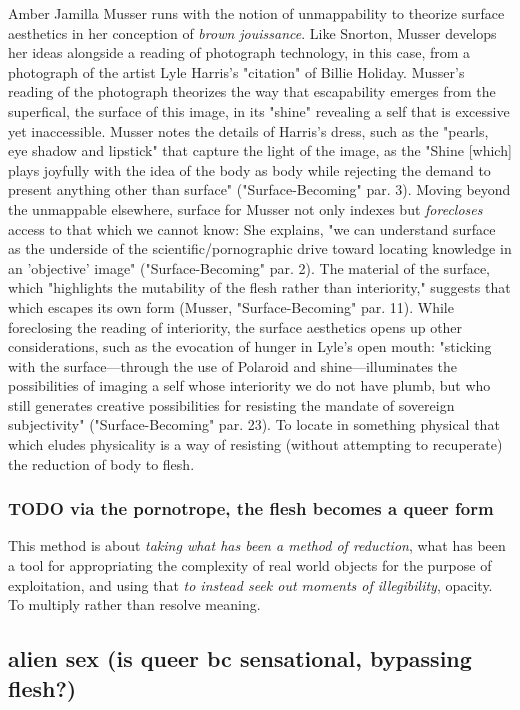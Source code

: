 \documentclass[11pt]{article}
\begin{document}
Amber Jamilla Musser runs with the notion of unmappability to theorize
surface aesthetics in her conception of \emph{brown jouissance}. Like
Snorton, Musser develops her ideas alongside a reading of photograph
technology, in this case, from a photograph of the artist Lyle
Harris's "citation" of Billie Holiday. Musser's reading of the
photograph theorizes the way that escapability emerges from the
superfical, the surface of this image, in its "shine" revealing a self
that is excessive yet inaccessible. Musser notes the details of
Harris's dress, such as the "pearls, eye shadow and lipstick" that
capture the light of the image, as the "Shine [which] plays joyfully
with the idea of the body as body while rejecting the demand to
present anything other than surface" ("Surface-Becoming"
par. 3). Moving beyond the unmappable elsewhere, surface for Musser
not only indexes but \emph{forecloses} access to that which we cannot know:
She explains, "we can understand surface as the underside of the
scientific/pornographic drive toward locating knowledge in an
'objective' image" ("Surface-Becoming" par. 2). The material of the
surface, which "highlights the mutability of the flesh rather than
interiority," suggests that which escapes its own form (Musser,
"Surface-Becoming" par. 11). While foreclosing the reading of
interiority, the surface aesthetics opens up other considerations,
such as the evocation of hunger in Lyle's open mouth: "sticking with
the surface--–through the use of Polaroid and shine–--illuminates the
possibilities of imaging a self whose interiority we do not have
plumb, but who still generates creative possibilities for resisting
the mandate of sovereign subjectivity" ("Surface-Becoming"
par. 23). To locate in something physical that which eludes
physicality is a way of resisting (without attempting to recuperate)
the reduction of body to flesh.

\subsubsection{{\bfseries\sffamily TODO} via the pornotrope, the flesh becomes a queer form}
\label{sec:orgaa7a31f}
This method is about \emph{taking what has been a method of reduction},
what has been a tool for appropriating the complexity of real world
objects for the purpose of exploitation, and using that \emph{to instead
seek out moments of illegibility}, opacity. To multiply rather than
resolve meaning.

\subsection{alien sex (is queer bc sensational, bypassing flesh?)}
\label{sec:org7f0edd3}
\end{document}
